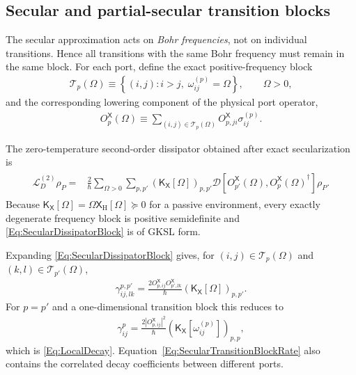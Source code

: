 \documentclass[prx,aps,twocolumn,article]{revtex4-2}
\newcommand{\msf}[1]{\mathsf{#1}}
\newcommand{\msKX}{\msf{K}_\msf{X}}
\newcommand{\msXH}{\msX_\mathrm{H}}
\newcommand{\msX}{\msf{X}}
\begin{document}
\subsection{Secular and partial-secular transition blocks}

The secular approximation acts on \emph{Bohr frequencies}, not on
individual transitions. Hence all transitions with the same Bohr frequency
must remain in the same block. For each port, define the exact
positive-frequency block
\begin{align}
    \mathcal T_p(\Omega)
    \equiv
    \left\{
        (i,j):
        i>j,\;
        \omega_{ij}^{(p)}=\Omega
    \right\},
    \qquad
    \Omega>0,
\end{align}
and the corresponding lowering component of the physical port operator,
\begin{align}
    O_p^{\msX}(\Omega)
    \equiv
    \sum_{(i,j)\in\mathcal T_p(\Omega)}
    O_{p,ji}^{\msX}
    \sigma_{ij}^{(p)}.
\label{Eq:TransitionBlockOperator}
\end{align}

The zero-temperature second-order dissipator obtained after exact
secularization is
\begin{align}
\begin{aligned}
    \mathcal L_D^{(2)}\rho_P
    ={}&
    \frac{2}{\hbar}
    \sum_{\Omega>0}
    \sum_{p,p'}
    \left(
        \msKX[\Omega]
    \right)_{p,p'}
    \mathcal D\!\left[
        O_{p'}^{\msX}(\Omega),
        {O_p^{\msX}(\Omega)}^\dagger
    \right]\rho_P.
\end{aligned}
\label{Eq:SecularDissipatorBlock}
\end{align}
Because
$\msKX[\Omega]=\Omega\msXH[\Omega]\succeq0$ for a passive environment, every exactly degenerate frequency block is positive semidefinite and \cref{Eq:SecularDissipatorBlock} is of GKSL form.

Expanding \cref{Eq:SecularDissipatorBlock} gives, for
$(i,j)\in\mathcal T_p(\Omega)$ and
$(k,l)\in\mathcal T_{p'}(\Omega)$,
\begin{align}
    \gamma_{ij,lk}^{p,p'}
    =
    \frac{
        2
        O_{p,ij}^{\msX}
        O_{p',lk}^{\msX}
    }{\hbar}
    \left(
        \msKX[\Omega]
    \right)_{p,p'}.
\label{Eq:SecularTransitionBlockRate}
\end{align}
For $p=p'$ and a one-dimensional transition block this reduces to
\begin{align}
    \gamma_{ij}^{p}
    =
    \frac{
        2|O_{p,ij}^{\msX}|^2
    }{\hbar}
    \left(
        \msKX[
            \omega_{ij}^{(p)}
        ]
    \right)_{p,p},
\end{align}
which is \cref{Eq:LocalDecay}.
Equation~\eqref{Eq:SecularTransitionBlockRate} also contains the
correlated decay coefficients between different ports.
\end{document}

